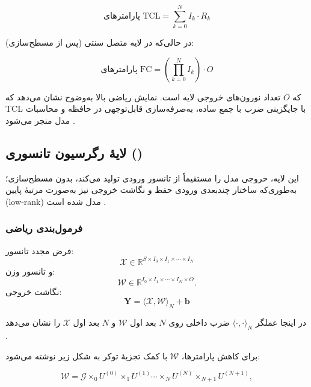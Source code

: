 \begin{equation}
	\text{پارامترهای TCL} = \sum_{k=0}^{N} I_k \cdot R_k
\end{equation}




در حالی‌که در لایه متصل سنتی (پس از مسطح‌سازی):


\begin{equation}
	\text{پارامترهای FC} = \left(\prod_{k=0}^{N} I_k\right) \cdot O
\end{equation}


که \(O\) تعداد نورون‌های خروجی لایه است. نمایش ریاضی بالا به‌وضوح نشان می‌دهد که TCL با جایگزینی ضرب با جمع ساده، به‌صرفه‌سازی قابل‌توجهی در حافظه و محاسبات مدل منجر می‌شود \cite{kossaifi2017tensorcontraction,kossaifi2020tensorregression}.

\subsection{لایهٔ رگرسیون تانسوری ()}

این لایه، خروجی مدل را مستقیماً از تانسور ورودی تولید می‌کند، بدون مسطح‌سازی؛ به‌طوری‌که ساختار چندبعدی ورودی حفظ و نگاشت خروجی نیز به‌صورت مرتبۀ پایین (low‑rank) مدل شده است \cite{kossaifi2020tensorregression}.

\subsubsection*{فرمول‌بندی ریاضی}

فرض مجدد تانسور:
\[
\mathcal{X} \in \mathbb{R}^{S \times I_0 \times I_1 \times \cdots \times I_N}
\]
و تانسور وزن:
\[
\mathcal{W} \in \mathbb{R}^{I_0 \times I_1 \times \cdots \times I_N \times O}.
\]
نگاشت خروجی:
\begin{equation}
	\mathbf{Y} = \langle \mathcal{X}, \mathcal{W} \rangle_N + \mathbf{b}
\end{equation}

در اینجا عملگر \(\langle \cdot,\cdot \rangle_N\) ضرب داخلی روی \(N\) بعد اول \(\mathcal{W}\) و \(N\) بعد اول \(\mathcal{X}\) را نشان می‌دهد \cite{kossaifi2020tensorregression}.

برای کاهش پارامترها، \(\mathcal{W}\)‌ با کمک تجزیۀ توکر به شکل زیر نوشته می‌شود:

\begin{equation}
	\mathcal{W} = \mathcal{G} \times_0 U^{(0)} \times_1 U^{(1)} \cdots \times_N U^{(N)} \times_{N+1} U^{(N+1)},
\end{equation}


